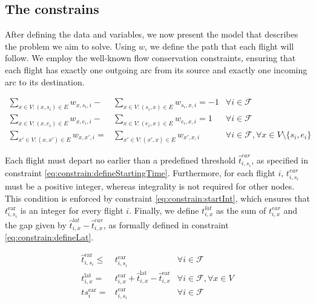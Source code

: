 \documentclass[../../thesis.tex]{subfiles}
\begin{document}
\subsection{The constrains}\label{ssec:bigModel:constrains}

After defining the data and variables, we now present the model that describes the problem we aim to solve.
Using \( w \), we define the path that each flight will follow.
We employ the well-known flow conservation constraints, ensuring that each flight has exactly one outgoing arc from its source and exactly one incoming arc to its destination.

\begin{align}
    \sum_{x\in V:(x,s_i)\in E} w_{x,s_i,i} -& \sum_{x\in V:(s_i,x)\in E} w_{s_i,x,i} = -1 & \forall i \in \mathcal{F} \\
    \sum_{x\in V:(x,e_i)\in E} w_{x,e_{i},i} -& \sum_{x\in V:(e_i,x)\in E} w_{e_{i},x,i} = 1 & \forall i \in \mathcal{F} \\
    \sum_{x'\in V:(x,x')\in E} w_{x,x',i} =& \sum_{x'\in V:(x',x)\in E} w_{x',x,i} & \forall i \in \mathcal{F}, \forall x \in V\setminus\{s_{i}, e_{i}\}
\end{align}

Each flight must depart no earlier than a predefined threshold \( \hat{t}^{ear}_{i,s_i} \), as specified in constraint \eqref{eq:constrain:defineStartingTime}.  
Furthermore, for each flight \( i \), \( t^{ear}_{i,s_i} \) must be a positive integer, whereas integrality is not required for other nodes.  
This condition is enforced by constraint \eqref{eq:constrain:startInt}, which ensures that \( t^\text{ear}_{i,s_i} \) is an integer for every flight \( i \).  
Finally, we define \( t^{lat}_{i,x} \) as the sum of \( t^{ear}_{i,x} \) and the gap given by \( \hat{t}^{lat}_{i,x} - \hat{t}^{ear}_{i,x} \), as formally defined in constraint \eqref{eq:constrain:defineLat}.

\begin{align}
    \hat t^\text{ear}_{i,s_i} \leq& t^\text{ear}_{i,s_i} & \forall i \in \mathcal{F} \label{eq:constrain:defineStartingTime}\\
    t^\text{lat}_{i,x} =& t^\text{ear}_{i,x} + \hat t^\text{lat}_{i,x} - \hat t^\text{ear}_{i,x} & \forall i \in \mathcal{F}, \forall x \in V \label{eq:constrain:defineLat} \\
    ts^\text{ear}_{i} =& t^\text{ear}_{i,s_i} & \forall i \in \mathcal{F}\label{eq:constrain:startInt}
\end{align}
\end{document}
